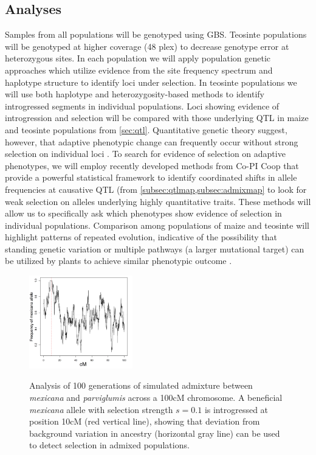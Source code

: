 \subsection{Analyses}
Samples from all populations will be genotyped using GBS.  Teosinte populations will be genotyped at higher coverage (48 plex) to decrease genotype error at heterozygous sites. In each population we will apply population genetic approaches which utilize evidence from the site frequency spectrum \citep{nielsen2005genomic} and haplotype structure \citep{voight2006map} to identify loci under selection.  In teosinte populations we will use both haplotype \citep{price2009sensitive} and heterozygosity-based \citep{Geneva2014} methods to identify introgressed segments in individual populations.  Loci showing evidence of introgression and selection will be compared with those underlying QTL in maize and teosinte populations from \ref{sec:qtl}.  Quantitative genetic theory suggest, however, that adaptive phenotypic change can frequently occur without strong selection on individual loci \citep{le2012genetic}.  To search for evidence of selection on adaptive phenotypes, we will employ recently developed methods from Co-PI Coop \citep{Berg2013} that provide a powerful statistical framework to identify coordinated shifts in allele frequencies at causative QTL (from \ref{subsec:qtlmap,subsec:admixmap} to look for weak selection on alleles underlying highly quantitative traits. These methods will allow us to specifically ask which phenotypes show evidence of selection in individual populations.  Comparison among populations of maize and teosinte will highlight patterns of repeated evolution, indicative of the possibility that standing genetic variation or multiple pathways (a larger mutational target) can be utilized by plants to achieve similar phenotypic outcome \citep{Ralph2010a}.

\begin{figure}
  \centering
  \caption{Analysis of 100 generations of simulated admixture between \emph{mexicana} and \emph{parviglumis} across a 100cM chromosome.   A  beneficial \emph{mexicana} allele with selection strength $s=0.1$ is introgressed at position 10cM (red vertical line), showing that  deviation from background variation in ancestry (horizontal gray line) can be used to detect selection in admixed populations. } 
   \includegraphics[width=0.4\textwidth]{admix.png}
\label{fig:yaniv}
\end{figure}


